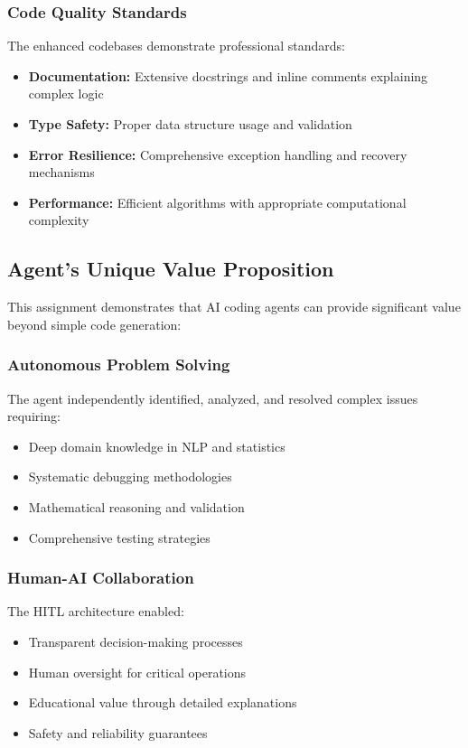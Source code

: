 \documentclass[12pt, a4paper]{article}
\begin{document}
\subsubsection{Code Quality Standards}
The enhanced codebases demonstrate professional standards:
\begin{itemize}
    \item \textbf{Documentation:} Extensive docstrings and inline comments explaining complex logic
    \item \textbf{Type Safety:} Proper data structure usage and validation
    \item \textbf{Error Resilience:} Comprehensive exception handling and recovery mechanisms
    \item \textbf{Performance:} Efficient algorithms with appropriate computational complexity
\end{itemize}

\subsection{Agent's Unique Value Proposition}

This assignment demonstrates that AI coding agents can provide significant value beyond simple code generation:

\subsubsection{Autonomous Problem Solving}
The agent independently identified, analyzed, and resolved complex issues requiring:
\begin{itemize}
    \item Deep domain knowledge in NLP and statistics
    \item Systematic debugging methodologies
    \item Mathematical reasoning and validation
    \item Comprehensive testing strategies
\end{itemize}

\subsubsection{Human-AI Collaboration}
The HITL architecture enabled:
\begin{itemize}
    \item Transparent decision-making processes
    \item Human oversight for critical operations
    \item Educational value through detailed explanations
    \item Safety and reliability guarantees
\end{itemize}
\end{document}
